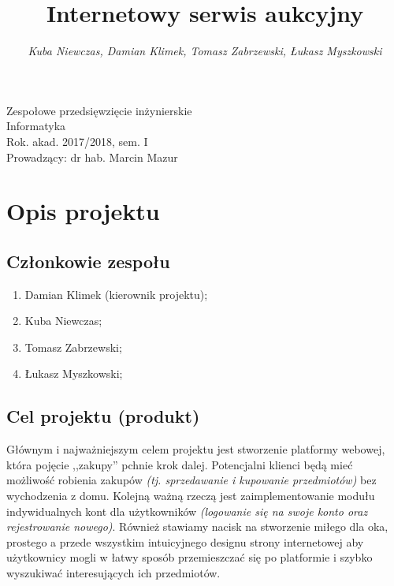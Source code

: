 \documentclass[a4paper]{article}
\title{\bf{Internetowy serwis aukcyjny}}
\author{{\em Kuba Niewczas, Damian Klimek, Tomasz Zabrzewski, Łukasz Myszkowski}}
\date{}
\begin{document}
\begin{titlepage}
\maketitle
\thispagestyle{empty}
\bigskip
\begin{center}
Zespołowe przedsięwzięcie inżynierskie\\[2mm]

Informatyka\\[2mm]

Rok. akad. 2017/2018, sem. I\\[2mm]

Prowadzący: dr hab. Marcin Mazur
\end{center}
\end{titlepage}

\tableofcontents
\thispagestyle{empty}

\newpage

\section{Opis projektu}

\subsection{Członkowie zespołu}

\begin{enumerate}
\item Damian Klimek (kierownik projektu);
\item Kuba Niewczas;
\item Tomasz Zabrzewski;
\item Łukasz Myszkowski;
\end{enumerate}

\subsection{Cel projektu (produkt)}

Głównym i najważniejszym celem projektu jest stworzenie platformy webowej, która pojęcie ,,zakupy'' pchnie krok dalej. Potencjalni klienci będą mieć możliwość robienia zakupów \emph{(tj. sprzedawanie i kupowanie przedmiotów)} bez wychodzenia z domu. Kolejną ważną rzeczą jest zaimplementowanie modułu indywidualnych kont dla użytkowników \emph{(logowanie się na swoje konto oraz rejestrowanie nowego)}. Również stawiamy nacisk na stworzenie miłego dla oka, prostego a przede wszystkim intuicyjnego designu strony internetowej aby użytkownicy mogli w łatwy sposób przemieszczać się po platformie i szybko wyszukiwać interesujących ich przedmiotów.
\end{document}
